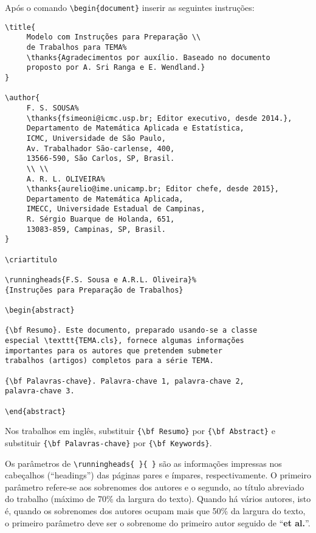 \documentclass{TEMA}
\begin{document}
Após o comando \verb!\begin{document}! inserir as seguintes
instruções:
\begin{framed}
\begin{verbatim}
\title{
     Modelo com Instruções para Preparação \\ 
     de Trabalhos para TEMA%
     \thanks{Agradecimentos por auxílio. Baseado no documento
     proposto por A. Sri Ranga e E. Wendland.}
}

\author{
     F. S. SOUSA%
     \thanks{fsimeoni@icmc.usp.br; Editor executivo, desde 2014.},
     Departamento de Matemática Aplicada e Estatística,
     ICMC, Universidade de São Paulo, 
     Av. Trabalhador São-carlense, 400, 
     13566-590, São Carlos, SP, Brasil.
     \\ \\
     A. R. L. OLIVEIRA%
     \thanks{aurelio@ime.unicamp.br; Editor chefe, desde 2015},
     Departamento de Matemática Aplicada,
     IMECC, Universidade Estadual de Campinas,
     R. Sérgio Buarque de Holanda, 651, 
     13083-859, Campinas, SP, Brasil. 
}

\criartitulo

\runningheads{F.S. Sousa e A.R.L. Oliveira}%
{Instruções para Preparação de Trabalhos}

\begin{abstract}

{\bf Resumo}. Este documento, preparado usando-se a classe
especial \texttt{TEMA.cls}, fornece algumas informações 
importantes para os autores que pretendem submeter 
trabalhos (artigos) completos para a série TEMA.

{\bf Palavras-chave}. Palavra-chave 1, palavra-chave 2,
palavra-chave 3.

\end{abstract}
\end{verbatim}
\end{framed}


Nos trabalhos em inglês, substituir \verb!{\bf Resumo}! por
\verb!{\bf Abstract}! e substituir \verb!{\bf Palavras-chave}!
por \verb!{\bf Keywords}!.

Os parâmetros de \verb!\runningheads{ }{ }! são as
informações impressas nos cabeçalhos (``headings'') das páginas
pares e ímpares, respectivamente.  O primeiro parâmetro refere-se
aos sobrenomes dos autores e o segundo, ao título abreviado do
trabalho (máximo de 70\% da largura do texto). Quando há vários
autores, isto é, quando os sobrenomes dos autores ocupam mais que
50\% da largura do texto, o primeiro parâmetro deve ser o
sobrenome do primeiro autor seguido de ``\textbf{et al.}''.
\end{document}
